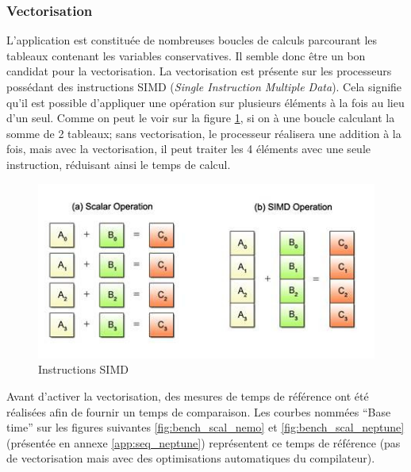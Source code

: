 \subsubsection{Vectorisation}\label{fig:vecto}
L'application est constituée de nombreuses boucles de calculs parcourant les tableaux contenant les variables conservatives. Il semble donc être un bon candidat pour la vectorisation. La vectorisation est présente sur les processeurs possédant des instructions SIMD (\textit{Single Instruction Multiple Data}). Cela signifie qu'il est possible d'appliquer une opération sur plusieurs éléments à la fois au lieu d'un seul. Comme on peut le voir sur la figure \ref{fig:simd}, si on à une boucle calculant la somme de 2 tableaux; sans vectorisation, le processeur réalisera une addition à la fois, mais avec la vectorisation, il peut traiter les 4 éléments avec une seule instruction, réduisant ainsi le temps de calcul.

\begin{figure}[ht]
  \centering
  \includegraphics[scale=0.85]{figures/simd.jpg}
  \caption{\label{fig:simd} Instructions SIMD}
\end{figure}


Avant d'activer la vectorisation, des mesures de temps de référence ont été réalisées afin de fournir un temps de comparaison. Les courbes nommées ``Base time'' sur les figures suivantes \ref{fig:bench_scal_nemo} et \ref{fig:bench_scal_neptune} (présentée en annexe \ref{app:seq_neptune}) représentent ce temps de référence (pas de vectorisation mais avec des optimisations automatiques du compilateur).

